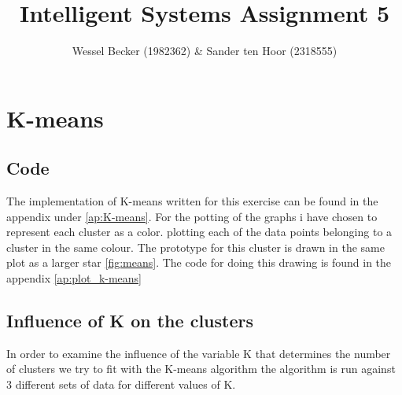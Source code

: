 \documentclass[10pt,a4paper]{article}
\begin{document}
\title{Intelligent Systems Assignment 5}
\author{Wessel Becker (1982362) \& Sander ten Hoor (2318555)}
\maketitle

\newcommand{\simplesubfigure}[3]{
  \noindent\begin{minipage}{.31\linewidth}
    \begin{center}
      \texttt{[image: \#1]}
      \captionof{figure}{#2}
      \label{#3}
    \end{center}
  \end{minipage}\hspace{7pt}
}
\newcommand{\simplefigure}[3]{
	\noindent\begin{figure}[H]
  	\centering
    	\makebox[.6\textwidth]
    	{
    		\texttt{[image: \#1]}
 		} \\
  		\caption{#2}
  		\label{#3}
	\end{figure}
}
\newcommand{\mcode}[1]{
	
}

\section{K-means}	
\subsection{Code}
The implementation of K-means written for this exercise can be found in the appendix under \ref{ap:K-means}. 
For the potting of the graphs i have chosen to represent each cluster as a color. plotting each of the data points belonging to a cluster in the same colour. The prototype for this cluster is drawn in the same plot as a larger star \ref{fig:means}. The code for doing this drawing is found in the appendix \ref{ap:plot_k-means}
\subsection{Influence of K on the clusters}
In order to examine the influence of the variable K that determines the number of clusters we try to fit with the K-means algorithm the algorithm is run against 3 different sets of data for different values of K.
\end{document}
